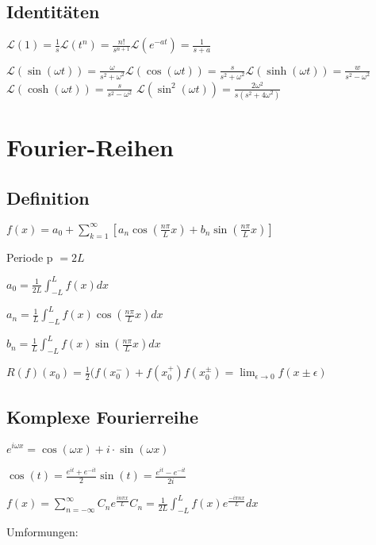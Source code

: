 \documentclass[10pt,a4paper]{scrartcl}
\renewcommand{\L}{\mathscr{L}}
\begin{document}
\begin{multicols*}{3}
	\subsection{Identitäten}
	
	$\L(1)=\frac{1}{s}$\hfill$\L(t^n)=\frac{n!}{s^{n+1}}$\hfill$\L(e^{-at})=\frac{1}{s+a}$
	
	$\L(\sin(\omega t))=\frac{\omega}{s^2+\omega^2}$\hfill$\L(\cos(\omega t))=\frac{s}{s^2+\omega^2}$\hfill$\L(\sinh(\omega t))=\frac{w}{s^2-\omega^2}$\hfill$\L(\cosh(\omega t))=\frac{s}{s^2-\omega^2}$ \hfill $\L(\sin^2(\omega t))=\frac{2\omega^2}{s(s^2+4\omega^2)}$
	
	\section{Fourier-Reihen}
	\subsection{Definition}
	
	$f(x)=a_0 + \sum_{k=1}^{\infty}{[a_n\cos(\frac{n\pi}{L}x)+b_n\sin(\frac{n\pi}{L}x)]}$ 
	
	Periode p $=2L$
	
	$a_0=\frac{1}{2L}\int_{-L}^L{f(x)dx}$
	
	$a_n=\frac{1}{L}\int_{-L}^L{f(x)\cos(\frac{n\pi}{L}x)dx}$
	
	$b_n=\frac{1}{L}\int_{-L}^L{f(x)\sin(\frac{n\pi}{L}x)dx}$

	 
	
	$R(f)(x_0)=\frac{1}{2}(f(x_0^-)+f(x_0^+)$\hfill$f(x_0^{\pm})=\lim_{\epsilon\rightarrow 0}{f(x\pm\epsilon)}$
	
	\subsection{Komplexe Fourierreihe}
	
	$e^{i\omega x}=\cos(\omega x)+ i\cdot \sin(\omega x)$
	
	$\cos(t)=\frac{e^{it}+e^{-it} }{2}$\hfill$\sin(t)=\frac{e^{it}-e^{-it}}{2i}$
	
	$f(x)=\sum_{n=-\infty}^{\infty}{C_ne^{\frac{in\pi x}{L}}}$\hfill$C_n=\frac{1}{2L}\int_{-L}^{L}{f(x)e^{\frac{-i\pi n x}{L}}dx}$
	
	\vspace{2ex}	
	
	Umformungen:
	\vspace{-2ex}
	\begin{multicols*}{2}
	

\end{multicols*}
\end{multicols*}
\end{document}
